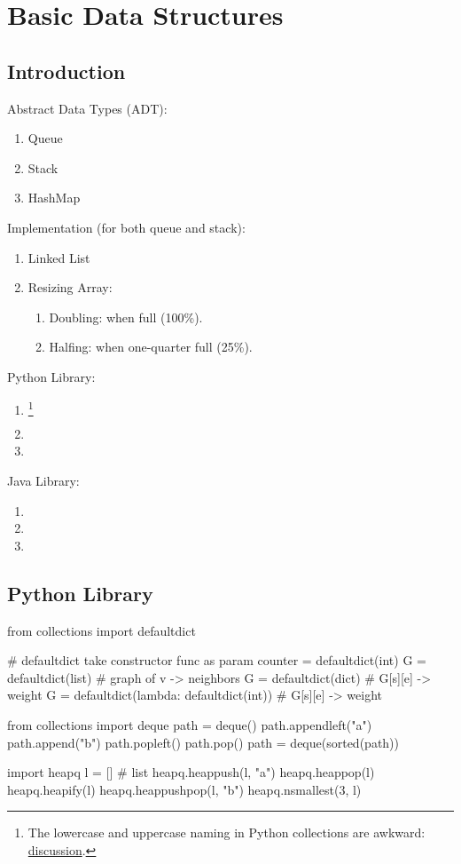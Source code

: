 \chapter{Basic Data  Structures}


\section{Introduction}
Abstract Data Types (ADT):
\begin{enumerate}
\item Queue
\item Stack
\item HashMap
\end{enumerate}
Implementation (for both queue and stack):
\begin{enumerate}
\item Linked List
\item Resizing Array:
\begin{enumerate}
\item Doubling: when full (100\%).
\item Halfing: when one-quarter full (25\%). 
\end{enumerate}
\end{enumerate}
Python Library:
\begin{enumerate}
\item {} \footnote{The lowercase and uppercase naming in Python collections are awkward: \href{http://stackoverflow.com/questions/18953681/naming-convention-in-collections-why-are-some-lowercase-and-others-capwords}{discussion}.}
\item {}
\item {}
\end{enumerate}
Java Library:
\begin{enumerate}
\item {}
\item {}
\item {}
\end{enumerate}

\section{Python Library}
\begin{python}
from collections import defaultdict

# defaultdict take constructor func as param
counter = defaultdict(int)
G = defaultdict(list)  # graph of v -> neighbors
G = defaultdict(dict)  # G[s][e] -> weight
G = defaultdict(lambda: defaultdict(int))  # G[s][e] -> weight


from collections import deque
path = deque()
path.appendleft("a")
path.append("b")
path.popleft()
path.pop()
path = deque(sorted(path))


import heapq
l = []  # list 
heapq.heappush(l, "a")
heapq.heappop(l)
heapq.heapify(l)
heapq.heappushpop(l, "b")
heapq.nsmallest(3, l)
\end{python}

